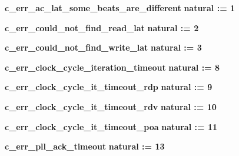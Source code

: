 \begin{DoxyCompactItemize}
\item 
{\bf c\+\_\+err\+\_\+ac\+\_\+lat\+\_\+some\+\_\+beats\+\_\+are\+\_\+different} {\bfseries \textcolor{comment}{natural}\textcolor{vhdlchar}{ }\textcolor{vhdlchar}{ }\textcolor{vhdlchar}{\+:}\textcolor{vhdlchar}{=}\textcolor{vhdlchar}{ }\textcolor{vhdlchar}{ } \textcolor{vhdldigit}{1} \textcolor{vhdlchar}{ }} 
\item 
{\bf c\+\_\+err\+\_\+could\+\_\+not\+\_\+find\+\_\+read\+\_\+lat} {\bfseries \textcolor{comment}{natural}\textcolor{vhdlchar}{ }\textcolor{vhdlchar}{ }\textcolor{vhdlchar}{\+:}\textcolor{vhdlchar}{=}\textcolor{vhdlchar}{ }\textcolor{vhdlchar}{ } \textcolor{vhdldigit}{2} \textcolor{vhdlchar}{ }} 
\item 
{\bf c\+\_\+err\+\_\+could\+\_\+not\+\_\+find\+\_\+write\+\_\+lat} {\bfseries \textcolor{comment}{natural}\textcolor{vhdlchar}{ }\textcolor{vhdlchar}{ }\textcolor{vhdlchar}{\+:}\textcolor{vhdlchar}{=}\textcolor{vhdlchar}{ }\textcolor{vhdlchar}{ } \textcolor{vhdldigit}{3} \textcolor{vhdlchar}{ }} 
\item 
{\bf c\+\_\+err\+\_\+clock\+\_\+cycle\+\_\+iteration\+\_\+timeout} {\bfseries \textcolor{comment}{natural}\textcolor{vhdlchar}{ }\textcolor{vhdlchar}{ }\textcolor{vhdlchar}{\+:}\textcolor{vhdlchar}{=}\textcolor{vhdlchar}{ }\textcolor{vhdlchar}{ } \textcolor{vhdldigit}{8} \textcolor{vhdlchar}{ }} 
\item 
{\bf c\+\_\+err\+\_\+clock\+\_\+cycle\+\_\+it\+\_\+timeout\+\_\+rdp} {\bfseries \textcolor{comment}{natural}\textcolor{vhdlchar}{ }\textcolor{vhdlchar}{ }\textcolor{vhdlchar}{\+:}\textcolor{vhdlchar}{=}\textcolor{vhdlchar}{ }\textcolor{vhdlchar}{ } \textcolor{vhdldigit}{9} \textcolor{vhdlchar}{ }} 
\item 
{\bf c\+\_\+err\+\_\+clock\+\_\+cycle\+\_\+it\+\_\+timeout\+\_\+rdv} {\bfseries \textcolor{comment}{natural}\textcolor{vhdlchar}{ }\textcolor{vhdlchar}{ }\textcolor{vhdlchar}{\+:}\textcolor{vhdlchar}{=}\textcolor{vhdlchar}{ }\textcolor{vhdlchar}{ } \textcolor{vhdldigit}{10} \textcolor{vhdlchar}{ }} 
\item 
{\bf c\+\_\+err\+\_\+clock\+\_\+cycle\+\_\+it\+\_\+timeout\+\_\+poa} {\bfseries \textcolor{comment}{natural}\textcolor{vhdlchar}{ }\textcolor{vhdlchar}{ }\textcolor{vhdlchar}{\+:}\textcolor{vhdlchar}{=}\textcolor{vhdlchar}{ }\textcolor{vhdlchar}{ } \textcolor{vhdldigit}{11} \textcolor{vhdlchar}{ }} 
\item 
{\bf c\+\_\+err\+\_\+pll\+\_\+ack\+\_\+timeout} {\bfseries \textcolor{comment}{natural}\textcolor{vhdlchar}{ }\textcolor{vhdlchar}{ }\textcolor{vhdlchar}{\+:}\textcolor{vhdlchar}{=}\textcolor{vhdlchar}{ }\textcolor{vhdlchar}{ } \textcolor{vhdldigit}{13} \textcolor{vhdlchar}{ }} 

\end{DoxyCompactItemize}
